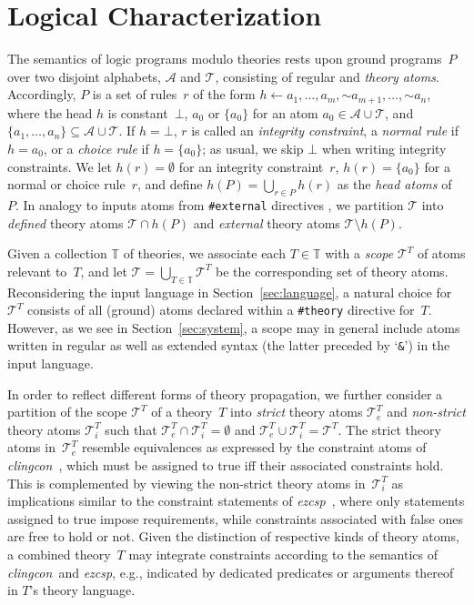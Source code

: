 \documentclass[a4paper,USenglish]{oasics-v2016}
\newcommand{\naf}[1]{\ensuremath{{\sim}{#1}}}
\newcommand{\head}[1]{\ensuremath{h(#1)}}
\newcommand{\sysfont}{\textit}
\newcommand{\clingcon}{\sysfont{clingcon}}
\newcommand{\ezcsp}{\sysfont{ezcsp}}
\begin{document}
\section{Logical Characterization}
\label{sec:foundations}

The semantics of logic programs modulo theories rests upon
ground programs~$P$ over two disjoint alphabets, $\mathcal{A}$ and $\mathcal{T}$,
consisting of regular and \emph{theory atoms}. %
Accordingly, $P$ is a set of rules~$r$ of the form
$h \leftarrow a_1,\dots,a_m,\naf{a_{m+1}},\dots,\naf{a_n}$,
where the head $h$ is constant~$\bot$, $a_0$ or $\{a_0\}$
for an atom $a_0\in\mathcal{A}\cup\mathcal{T}$, and
$\{a_1,\dots,a_n\}\subseteq\mathcal{A}\cup\mathcal{T}$.
If $h=\bot$, $r$ is called an \emph{integrity constraint},
a \emph{normal rule} if $h=a_0$, or
a \emph{choice rule} if $h=\{a_0\}$;
as usual, we skip $\bot$ when writing integrity constraints.
We let $\head{r}=\emptyset$ for an integrity constraint~$r$,
$\head{r}=\{a_0\}$ for a normal or choice rule~$r$,
and define $\head{P}=\bigcup_{r\in P}\head{r}$ as the \emph{head atoms} of~$P$.
In analogy to inputs atoms from
\lstinline{#external} directives \cite{gekakasc14b},
we partition $\mathcal{T}$ into
\emph{defined} theory atoms $\mathcal{T}\cap\head{P}$ and
\emph{external} theory atoms $\mathcal{T}\setminus\head{P}$.

Given a collection $\mathbb{T}$ of theories,
we associate each $T\in\mathbb{T}$ with a \emph{scope}
$\mathcal{T}^T$ of atoms
relevant to~$T$, and let
$\mathcal{T}=\bigcup_{T\in\mathbb{T}}\mathcal{T}^T$
be the corresponding set of theory atoms.
%
Reconsidering the input language in Section~\ref{sec:language},
a natural choice for $\mathcal{T}^T$ consists %
of all (ground) atoms declared within a
\lstinline{#theory} directive for~$T$.
%
However, as we see in Section~\ref{sec:system},
a scope may in general include atoms written in
regular as well as extended syntax (the latter preceded by `\lstinline{&}') in the input language.

In order to reflect different forms of theory propagation,
we further consider a partition of the scope $\mathcal{T}^T$ of a theory~$T$ into %
\emph{strict} theory atoms $\mathcal{T}^T_e$ and
\emph{non-strict} theory atoms $\mathcal{T}^T_i$
such that
$\mathcal{T}^T_e\cap\mathcal{T}^T_i=\emptyset$ and
$\mathcal{T}^T_e\cup\mathcal{T}^T_i=\mathcal{T}^T$.
The strict theory atoms in~$\mathcal{T}^T_e$ resemble equivalences as expressed by the constraint atoms
of \clingcon\ \cite{ostsch12a}, which must be assigned to true iff their associated
constraints hold.
This is complemented by viewing the non-strict theory atoms in~$\mathcal{T}^T_i$ as
implications similar to the constraint statements of \ezcsp\ \cite{balduccini09a},
where only statements assigned to true impose requirements, while constraints associated with
false ones are free to hold or not.
Given the distinction of respective kinds of theory atoms,
a combined theory~$T$ may integrate constraints according to the semantics of \clingcon\ and \ezcsp,
e.g., indicated by dedicated predicates or arguments thereof in $T$'s theory language.
\end{document}
